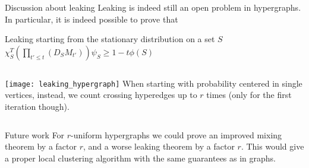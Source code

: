 \documentclass[../main.tex]{subfiles}
\begin{document}
    \begin{frame}{Discussion about leaking}         
        Leaking is indeed still an open problem in hypergraphs. In particular, it is indeed possible to prove that 
        \begin{block}{Leaking starting from the stationary distribution on a set $S$}
			$\chi_S^T(\prod_{t'\leq t}(D_S M_{t'})) \psi_S \geq 1 - t\phi(S)$
        \end{block}
    	
    	\begin{columns}
	    		\texttt{[image: leaking\_hypergraph]}
    			When starting with probability centered in single vertices, instead, we count crossing hyperedges up to $r$ times (only for the first iteration though).
		\end{columns}
    \end{frame}

	\begin{frame}{Future work}
		For $r$-uniform hypergraphs we could prove an improved mixing theorem by a factor $r$, and a worse leaking theorem by a factor $r$. This would give a proper local clustering algorithm with the same guarantees as in graphs.
	\end{frame}
	
\end{document}
